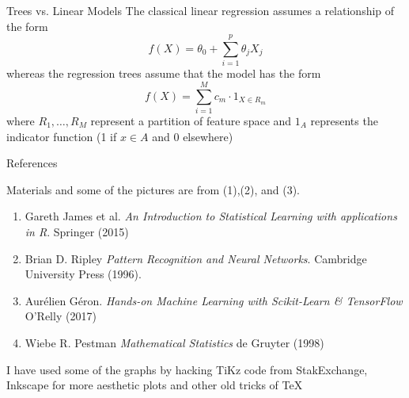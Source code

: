\documentclass{beamer}
\begin{document}
\begin{frame}{Trees vs. Linear Models}
	The classical linear regression assumes a relationship of the form
	\begin{equation*}
		f(X)= \theta_0 + \sum_{i=1}^p \theta_j X_j
	\end{equation*}
whereas the regression trees assume that the model has the form
\begin{equation*}
	f(X)=\sum_{i=1}^M c_m \cdot 1_{X \in R_m}
\end{equation*}
where $R_1,\ldots,R_M$ represent a partition of feature space and $1_A$ represents the indicator function (1 if $x\in A$ and 0 elsewhere)
\end{frame}

\begin{frame}{References}

Materials and some of the pictures are from (1),(2), and (3).
\begin{enumerate}
	\item Gareth James et al. {\it An Introduction to Statistical Learning with applications in R}. Springer (2015)
	\item Brian D. Ripley {\it Pattern Recognition and Neural Networks}. Cambridge University Press (1996). 
	\item Aur\'elien G\'eron. {\it Hands-on Machine Learning with Scikit-Learn \& TensorFlow} O'Relly (2017)
	\item Wiebe R. Pestman {\it Mathematical Statistics} de Gruyter (1998)
	
\end{enumerate}	

I have used some of the graphs by hacking TiKz code from StakExchange, Inkscape for more aesthetic plots and other old tricks of \TeX
\end{frame}	
\end{document}
